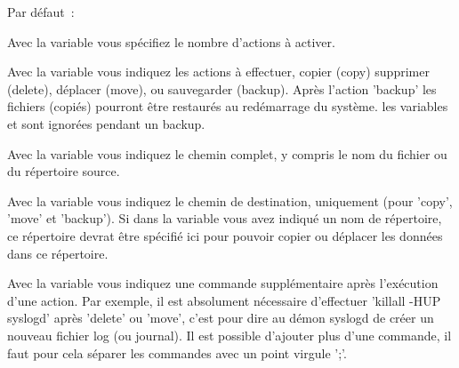 \begin{description}

  Par défaut~: 

  Avec la variable  vous spécifiez le nombre d'actions
  à activer.\\


  Avec la variable  vous indiquez les actions à
  effectuer, copier (copy) supprimer (delete), déplacer (move), ou sauvegarder
  (backup). Après l'action 'backup' les fichiers (copiés) pourront être
  restaurés au redémarrage du système. les variables 
  et  sont ignorées pendant un backup.\\


  Avec la variable  vous indiquez le chemin complet,
  y compris le nom du fichier ou du répertoire source.\\


  Avec la variable  vous indiquez le chemin de
  destination, uniquement (pour 'copy', 'move' et 'backup'). Si dans la variable
   vous avez indiqué un nom de répertoire, ce répertoire
  devrat être spécifié ici pour pouvoir copier ou déplacer les données dans ce
  répertoire.\\


  Avec la variable  vous indiquez une commande
  supplémentaire après l'exécution d'une action. Par exemple, il est absolument
  nécessaire d'effectuer 'killall -HUP syslogd' après 'delete' ou 'move', c'est
  pour dire au démon syslogd de créer un nouveau fichier log (ou journal). Il
  est possible d'ajouter plus d'une commande, il faut pour cela séparer les
  commandes avec un point virgule ';'.\\



\end{description}
